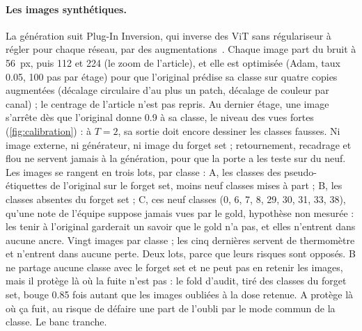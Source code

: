 \documentclass[11pt,a4paper]{article}
\begin{document}
\paragraph{Les images synthétiques.} La génération suit Plug-In Inversion, qui inverse des ViT sans
régulariseur à régler pour chaque réseau, par des augmentations~\cite{ghiasi2022pii}. Chaque image part
du bruit à \SI{56}{px}, puis \num{112} et \num{224} (le zoom de l'article), et elle est optimisée
(Adam, taux \num{0.05}, 100 pas par étage) pour que l'original prédise sa classe sur quatre copies
augmentées (décalage circulaire d'au plus un patch, décalage de couleur par canal) ; le centrage de
l'article n'est pas repris. Au dernier étage, une image s'arrête dès que l'original donne
\num{0.9} à sa classe, le niveau des vues fortes (\cref{fig:calibration}) : à $T=2$, sa sortie doit
encore dessiner les classes fausses. Ni image externe, ni générateur, ni image du forget set ;
retournement, recadrage et flou ne servent jamais à la génération, pour que la porte a les teste sur
du neuf. Les images se rangent en trois lots, par classe : A, les classes des pseudo-étiquettes de
l'original sur le forget set, moins neuf classes mises à part ; B, les classes absentes du forget
set ; C, ces neuf classes (0, 6, 7, 8, 29, 30, 31, 33, 38), qu'une note de l'équipe suppose jamais
vues par le gold, hypothèse non mesurée : les tenir à l'original garderait un savoir que le gold n'a
pas, et elles n'entrent dans aucune ancre. Vingt images par classe ; les cinq dernières servent de
thermomètre et n'entrent dans aucune perte. Deux lots, parce que leurs risques sont opposés. B ne
partage aucune classe avec le forget set et ne peut pas en retenir les images, mais il protège là où
la fuite n'est pas : le fold d'audit, tiré des classes du forget set, bouge \num{0.85} fois autant que
les images oubliées à la dose retenue. A protège là où ça fuit, au risque de défaire une part de
l'oubli par le mode commun de la classe. Le banc tranche.
\end{document}
